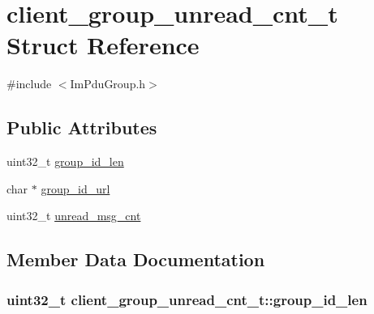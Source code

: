 \hypertarget{structclient__group__unread__cnt__t}{}\section{client\+\_\+group\+\_\+unread\+\_\+cnt\+\_\+t Struct Reference}
\label{structclient__group__unread__cnt__t}


{\ttfamily \#include $<$Im\+Pdu\+Group.\+h$>$}

\subsection*{Public Attributes}
\begin{DoxyCompactItemize}
\item 
uint32\+\_\+t \hyperlink{structclient__group__unread__cnt__t_acdc9fe365aa174764c3f1e027d950451}{group\+\_\+id\+\_\+len}
\item 
char $\ast$ \hyperlink{structclient__group__unread__cnt__t_abf3b3a4454e5d35aed4ebe84655e3a5d}{group\+\_\+id\+\_\+url}
\item 
uint32\+\_\+t \hyperlink{structclient__group__unread__cnt__t_a8ca51108d3521898727d274d462a0e6e}{unread\+\_\+msg\+\_\+cnt}
\end{DoxyCompactItemize}


\subsection{Member Data Documentation}
\hypertarget{structclient__group__unread__cnt__t_acdc9fe365aa174764c3f1e027d950451}{}
\subsubsection[{group\+\_\+id\+\_\+len}]{\setlength{\rightskip}{0pt plus 5cm}uint32\+\_\+t client\+\_\+group\+\_\+unread\+\_\+cnt\+\_\+t\+::group\+\_\+id\+\_\+len}\label{structclient__group__unread__cnt__t_acdc9fe365aa174764c3f1e027d950451}
\hypertarget{structclient__group__unread__cnt__t_abf3b3a4454e5d35aed4ebe84655e3a5d}{}
